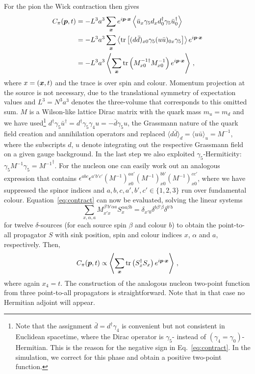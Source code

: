For the pion the Wick contraction then gives
\begin{align}
C_{\pi}(\boldsymbol{p},t)
&= -L^3a^3\sum_{\boldsymbol{x}}
e^{i \boldsymbol{p}\cdot\boldsymbol{x}} \left\langle\bar{u}_x \gamma_5 d_{x} d^{\dagger}_0 \gamma_5
\bar{u}^{\dagger}_0\right\rangle\label{eq:contract} \\\nonumber
&=-L^3a^3\sum_{\boldsymbol{x}}\left\langle\mathop{\textmd{tr}}\nolimits\left[(d\bar{d})_{x0}\gamma_5
(u\bar{u})_{0x}\gamma_5\right]\right\rangle e^{i \boldsymbol{p}\cdot\boldsymbol{x}}\\
&=-L^3a^3\left\langle\sum_{\boldsymbol{x}}\mathop{\textmd{tr}}\nolimits\left(M^{-1\dagger}_{x0}M^{-1}_{x0}
\right)e^{i \boldsymbol{p}\cdot\boldsymbol{x}}\right\rangle\,,\nonumber
\end{align}
where $x=(\boldsymbol{x},t)$ and the trace is over spin and colour.
Momentum projection at the source is not
necessary, due to the translational symmetry of expectation values
and $L^3=N^3a^3$ denotes the three-volume that corresponds to this omitted sum.
$M$ is a Wilson-like lattice Dirac matrix
with the quark mass $m_u=m_d$ and we
have used\footnote{Note that the assignment
$\bar{d}=d^{\dagger}\gamma_4$ is convenient but
not consistent in Euclidean spacetime, where
the Dirac operator is $\gamma_5$- instead of
$(\gamma_4=\gamma_0)$-Hermitian.
This is the reason for the negative sign in Eq.~\eqref{eq:contract}.
In the simulation, we correct for this phase and obtain a
positive two-point function.} $d^\dagger\gamma_5\bar{u}^\dagger=d^\dagger
\gamma_5\gamma_4u=-\bar{d}\gamma_5u$, the Grassmann nature of the
quark field creation and annihilation operators and replaced
$\langle d\bar{d}\rangle_d=\langle u\bar{u}\rangle_u=M^{-1}$,
where the subscripts $d$, $u$ denote integrating out the respective
Grassmann field
on a given gauge background. In the last step we also
exploited $\gamma_5$-Hermiticity:
$\gamma_5M^{-1}\gamma_5={M^{-1}}^{\dagger}$.
For the nucleon one can easily work out an analogous expression that contains
$\epsilon^{abc}\epsilon^{a'b'c'}(M^{-1})_{x0}^{aa'}
(M^{-1})_{x0}^{bb'}(M^{-1})_{x0}^{cc'}$, where we have suppressed the
spinor indices and $a,b,c,a',b',c'\in\{1,2,3\}$ run over fundamental
colour.
Equation~\eqref{eq:contract} can now be evaluated, solving the linear systems
\begin{equation}
\sum_{x,\alpha, a}M^{\beta' b'\alpha a}_{x'x}S^{\alpha a \beta  b}_x=\delta_{x'0}\delta^{b\beta'\beta}\delta^{b'b}\label{eq:prop}
\end{equation}
for twelve $\delta$-sources
(for each source spin $\beta$ and colour $b$) to obtain the point-to-all
propagator $S$ with sink position, spin and colour indices
$x$, $\alpha$ and $a$, respectively. Then,
\begin{equation}
C_{\pi}(\boldsymbol{p},t)\propto\left\langle\sum_{\boldsymbol{x}}\mathop{\textmd{tr}}\nolimits\left(S^{\dagger}_xS_x\right)e^{i\boldsymbol{p}\cdot\boldsymbol{x}}
\right\rangle\,,\label{eq:picontract}
\end{equation}
where again $x_4=t$. The construction of the analogous nucleon
two-point function from three point-to-all propagators
is straightforward. Note that in that case no Hermitian adjoint
will appear.

